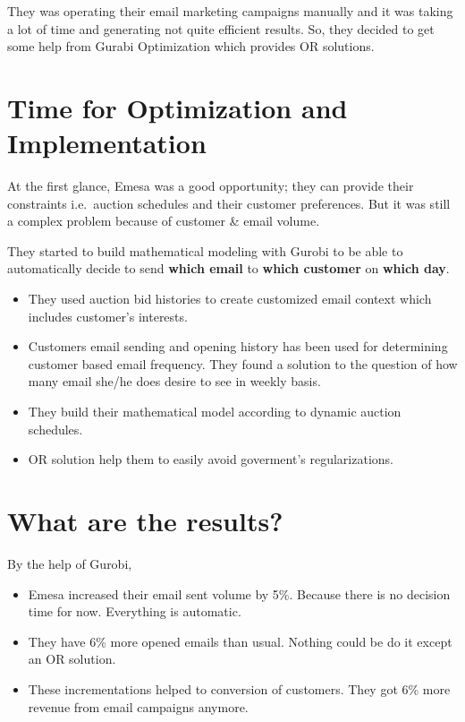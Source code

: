 \documentclass[
  letterpaper,
  DIV=11,
  numbers=noendperiod]{scrreprt}
\providecommand{\tightlist}{%
  \setlength{\itemsep}{0pt}\setlength{\parskip}{0pt}}\usepackage{longtable,booktabs,array}
\begin{document}
They was operating their email marketing campaigns manually and it was
taking a lot of time and generating not quite efficient results. So,
they decided to get some help from Gurabi Optimization which provides OR
solutions.

\hypertarget{time-for-optimization-and-implementation}{%
\section{Time for Optimization and
Implementation}\label{time-for-optimization-and-implementation}}

At the first glance, Emesa was a good opportunity; they can provide
their constraints i.e.~auction schedules and their customer preferences.
But it was still a complex problem because of customer \& email volume.

They started to build mathematical modeling with Gurobi to be able to
automatically decide to send \textbf{which email} to \textbf{which
customer} on \textbf{which day}.

\begin{itemize}
\item
  They used auction bid histories to create customized email context
  which includes customer's interests.
\item
  Customers email sending and opening history has been used for
  determining customer based email frequency. They found a solution to
  the question of how many email she/he does desire to see in weekly
  basis.
\item
  They build their mathematical model according to dynamic auction
  schedules.
\item
  OR solution help them to easily avoid goverment's regularizations.
\end{itemize}

\hypertarget{what-are-the-results}{%
\section{What are the results?}\label{what-are-the-results}}

By the help of Gurobi,

\begin{itemize}
\tightlist
\item
  Emesa increased their email sent volume by 5\%. Because there is no
  decision time for now. Everything is automatic.
\item
  They have 6\% more opened emails than usual. Nothing could be do it
  except an OR solution.
\item
  These incrementations helped to conversion of customers. They got 6\%
  more revenue from email campaigns anymore.
\end{itemize}
\end{document}
